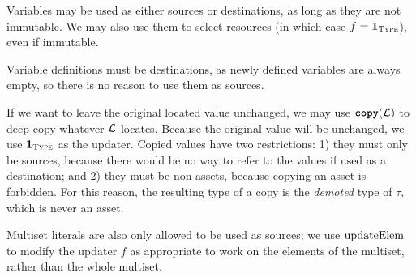 \documentclass[nonacm, dvipsnames, sigconf]{acmart}
\begin{document}
Variables may be used as either sources or destinations, as long as they are not immutable.
We may also use them to select resources (in which case $f = \id{\types}$), even if immutable.
\begin{mathpar}
\end{mathpar}

Variable definitions must be destinations, as newly defined variables are always empty, so there is no reason to use them as sources.
\begin{mathpar}
\end{mathpar}

If we want to leave the original located value unchanged, we may use $\copyC(\Loc)$ to deep-copy whatever $\Loc$ locates.
Because the original value will be unchanged, we use $\id{\types}$ as the updater.
Copied values have two restrictions: 1) they must only be sources, because there would be no way to refer to the values if used as a destination; and 2) they must be non-assets, because copying an asset is forbidden.
For this reason, the resulting type of a copy is the \emph{demoted} type of $\tau$, which is never an asset.
\begin{mathpar}

\end{mathpar}

Multiset literals are also only allowed to be used as sources; we use $\updateElem$ to modify the updater $f$ as appropriate to work on the elements of the multiset, rather than the whole multiset.
\begin{mathpar}
\end{mathpar}
\end{document}
